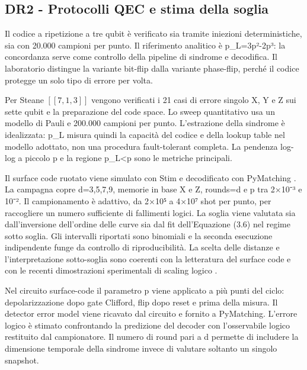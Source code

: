\subsection{DR2 - Protocolli QEC e stima della soglia}\label{sec:finale_3_5_3}

Il codice a ripetizione a tre qubit è verificato sia tramite iniezioni deterministiche, sia con 20.000 campioni per punto. Il riferimento analitico è p\_L=3p²-2p³: la concordanza serve come controllo della pipeline di sindrome e decodifica. Il laboratorio distingue la variante bit-flip dalla variante phase-flip, perché il codice protegge un solo tipo di errore per volta.

Per Steane \ensuremath{[[7,1,3]]} vengono verificati i 21 casi di errore singolo X, Y e Z sui sette qubit e la preparazione del code space. Lo sweep quantitativo usa un modello di Pauli e 200.000 campioni per punto. L'estrazione della sindrome è idealizzata: p\_L misura quindi la capacità del codice e della lookup table nel modello adottato, non una procedura fault-tolerant completa. La pendenza log-log a piccolo p e la regione p\_L\textless p sono le metriche principali.

Il surface code ruotato viene simulato con Stim \cite{stim2021} e decodificato con PyMatching \cite{pymatching2021}. La campagna copre d=3,5,7,9, memorie in base X e Z, rounds=d e p tra 2×10⁻³ e 10⁻². Il campionamento è adattivo, da 2×10⁵ a 4×10⁷ shot per punto, per raccogliere un numero sufficiente di fallimenti logici. La soglia viene valutata sia dall'inversione dell'ordine delle curve sia dal fit dell'Equazione (3.6) nel regime sotto soglia. Gli intervalli riportati sono binomiali e la seconda esecuzione indipendente funge da controllo di riproducibilità. La scelta delle distanze e l'interpretazione sotto-soglia sono coerenti con la letteratura del surface code e con le recenti dimostrazioni sperimentali di scaling logico \cite{fowler2012,googleQECBelowThreshold2025,googleSurfaceCode2023,dennis2002topological}.

Nel circuito surface-code il parametro p viene applicato a più punti del ciclo: depolarizzazione dopo gate Clifford, flip dopo reset e prima della misura. Il detector error model viene ricavato dal circuito e fornito a PyMatching. L'errore logico è stimato confrontando la predizione del decoder con l'osservabile logico restituito dal campionatore. Il numero di round pari a d permette di includere la dimensione temporale della sindrome invece di valutare soltanto un singolo snapshot.

